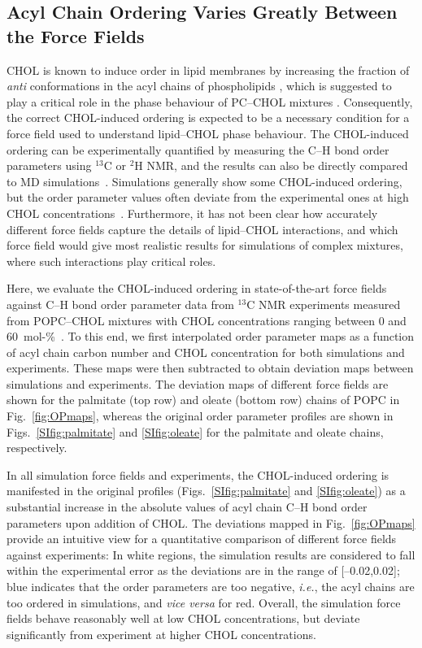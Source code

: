 \documentclass[journal=jctcce]{achemso}
\begin{document}
\subsection{Acyl Chain Ordering Varies Greatly Between the Force Fields}

CHOL is known to induce order in lipid membranes by increasing the fraction of \textit{anti} conformations in the acyl chains of phospholipids \cite{ferreira13}, which is suggested to play a critical role in the phase behaviour of PC--CHOL mixtures \cite{ipsen87}. Consequently, the correct CHOL-induced ordering is expected to be a necessary condition for a force field used to understand lipid--CHOL phase behaviour. The CHOL-induced ordering can be experimentally quantified by measuring the C--H bond order parameters using $^{13}$C or $^{2}$H NMR, and the results can also be directly compared to MD simulations~\cite{ollila16}. Simulations generally show some CHOL-induced ordering, but the order parameter values often deviate from the experimental ones at high CHOL concentrations~\cite{ferreira13,madej15}. Furthermore, it has not been clear how accurately different force fields capture the details of lipid--CHOL interactions, and which force field would give most realistic results for simulations of complex mixtures, where such interactions play critical roles. 

Here, we evaluate the CHOL-induced ordering in state-of-the-art force fields against C--H bond order parameter data from $^{13}$C NMR experiments measured from POPC--CHOL mixtures with CHOL concentrations ranging between 0 and 60~mol-\%~\cite{ferreira13}. To this end, we first interpolated order parameter maps as a function of acyl chain carbon number and CHOL concentration for both simulations and experiments. These maps were then subtracted to obtain deviation maps between simulations and experiments. The deviation maps of different force fields are shown for the palmitate (top row) and oleate (bottom row) chains of POPC in Fig.~\ref{fig:OPmaps}, whereas the original order parameter profiles are shown in Figs.~\ref{SIfig:palmitate} and \ref{SIfig:oleate} for the palmitate and oleate chains, respectively.

In all simulation force fields and experiments, the CHOL-induced ordering is manifested in the original profiles (Figs.~\ref{SIfig:palmitate} and \ref{SIfig:oleate}) as a substantial increase in the absolute values of acyl chain C--H bond order parameters upon addition of CHOL. The deviations mapped in Fig.~\ref{fig:OPmaps} provide an intuitive view for a quantitative comparison of different force fields against experiments: In white regions, the simulation results are considered to fall within the experimental error as the deviations are in the range of [--0.02,0.02]; blue indicates that the order parameters are too negative, \textit{i.e.}, the acyl chains are too ordered in simulations, and \textit{vice versa} for red. Overall, the simulation force fields behave reasonably well at low CHOL concentrations, but deviate significantly from experiment at higher CHOL concentrations. 
\end{document}

